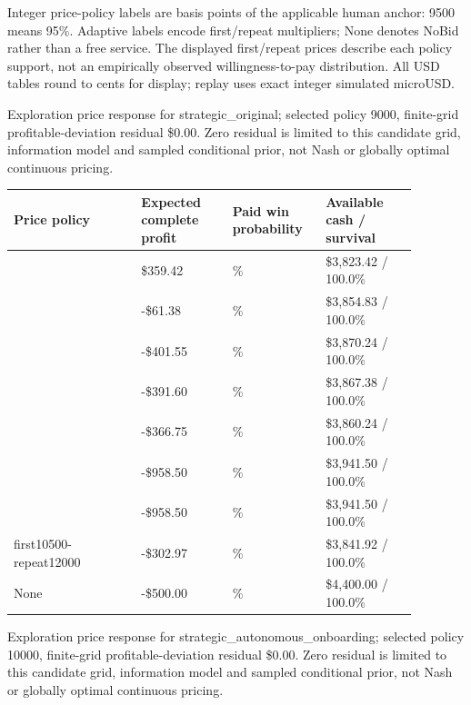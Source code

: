 \documentclass[10pt,letterpaper]{article}
\begin{document}
Integer price-policy labels are basis points of the applicable human anchor: 9500 means 95\%. Adaptive labels encode first/repeat multipliers; None denotes NoBid rather than a free service. The displayed first/repeat prices describe each policy support, not an empirically observed willingness-to-pay distribution. All USD tables round to cents for display; replay uses exact integer simulated microUSD.

Exploration price response for strategic\_\allowbreak{}original; selected policy 9000, finite-grid profitable-deviation residual \$0.00. Zero residual is limited to this candidate grid, information model and sampled conditional prior, not Nash or globally optimal continuous pricing.

\begin{longtable}{>{\raggedright\arraybackslash}p{0.280\linewidth}>{\raggedright\arraybackslash}p{0.200\linewidth}>{\raggedright\arraybackslash}p{0.200\linewidth}>{\raggedright\arraybackslash}p{0.200\linewidth}}
\toprule
\textbf{Price policy} & \textbf{Expected complete profit} & \textbf{Paid win probability} & \textbf{Available cash / survival}\\
\midrule
\endhead
9000 & \$359.42 & 80.2\% & \$3,823.42 / 100.0\%\\
9500 & -\$61.38 & 52.1\% & \$3,854.83 / 100.0\%\\
9800 & -\$401.55 & 32.3\% & \$3,870.24 / 100.0\%\\
10000 & -\$391.60 & 32.3\% & \$3,867.38 / 100.0\%\\
10500 & -\$366.75 & 32.3\% & \$3,860.24 / 100.0\%\\
12000 & -\$958.50 & 0.0\% & \$3,941.50 / 100.0\%\\
15000 & -\$958.50 & 0.0\% & \$3,941.50 / 100.0\%\\
first10500-repeat12000 & -\$302.97 & 32.3\% & \$3,841.92 / 100.0\%\\
None & -\$500.00 & 0.0\% & \$4,400.00 / 100.0\%\\
\bottomrule
\end{longtable}
Exploration price response for strategic\_\allowbreak{}autonomous\_\allowbreak{}onboarding; selected policy 10000, finite-grid profitable-deviation residual \$0.00. Zero residual is limited to this candidate grid, information model and sampled conditional prior, not Nash or globally optimal continuous pricing.
\end{document}
